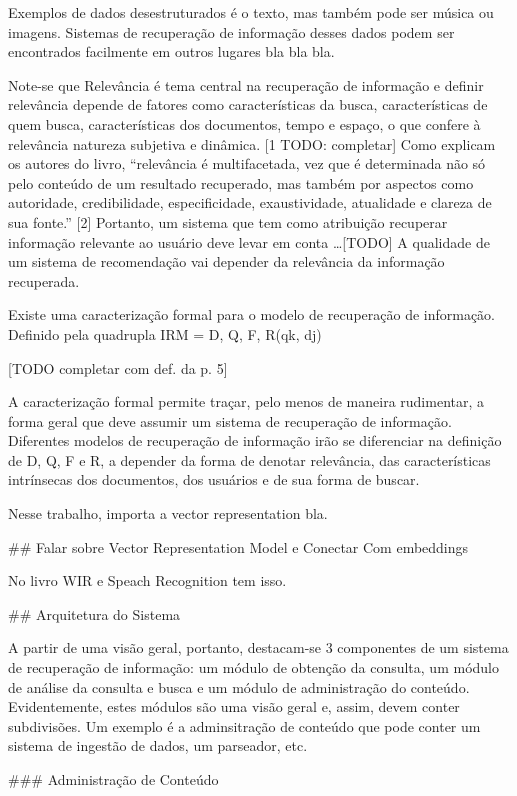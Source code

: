 Exemplos de dados desestruturados é o texto, mas também pode ser música ou imagens. Sistemas de recuperação de informação
desses dados podem ser encontrados facilmente em outros lugares bla bla bla.

Note-se que  Relevância é tema central na recuperação de informação e definir relevância depende de fatores como 
características da busca, características de quem busca, características dos documentos, tempo e espaço, o que confere 
à relevância natureza subjetiva e dinâmica. [1 TODO: completar] Como explicam os autores do livro, “relevância é 
multifacetada, vez que é determinada não só pelo conteúdo de um resultado recuperado, mas também por aspectos como 
autoridade, credibilidade, especificidade, exaustividade, atualidade e clareza de sua fonte.” [2] Portanto, um sistema 
que tem como atribuição recuperar informação relevante ao usuário deve levar em conta …[TODO] A qualidade de um sistema
de recomendação vai depender da relevância da informação recuperada.

Existe uma caracterização formal para o modelo de recuperação de informação. Definido pela quadrupla IRM = {D, Q, F, R(qk, dj)}

[TODO completar com def. da p. 5]

A caracterização formal permite traçar, pelo menos de maneira rudimentar, a forma geral que deve assumir um sistema de 
recuperação de informação. Diferentes modelos de recuperação de informação irão se diferenciar na definição de D, Q, F e R,
a depender da forma de denotar relevância, das características intrínsecas dos documentos, dos usuários e de sua 
forma de buscar.

Nesse trabalho, importa a vector representation bla.

## Falar sobre Vector Representation Model e Conectar Com embeddings

No livro WIR e Speach Recognition tem isso.



## Arquitetura do Sistema

A partir de uma visão geral, portanto, destacam-se 3 componentes de um sistema de recuperação de informação: um módulo de 
obtenção da consulta, um módulo de análise da consulta e busca e um módulo de administração do conteúdo. Evidentemente,
estes módulos são uma visão geral e, assim, devem conter subdivisões. Um exemplo é a adminsitração de conteúdo que pode
conter um sistema de ingestão de dados, um parseador, etc.

### Administração de Conteúdo

